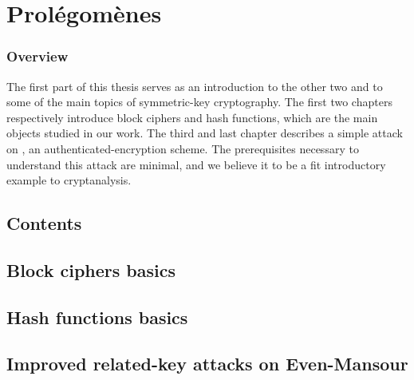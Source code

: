 \part[Prolégomènes]
	{Prolégomènes}
\label{part:prolego}

\section*{Overview}

The first part of this thesis serves as an introduction to the other two and to some of the
main topics of symmetric-key cryptography. The first two chapters respectively introduce block ciphers
and hash functions, which are the main objects studied in our work. The third and last chapter
describes a simple attack on \proestotr, an authenticated-encryption scheme. The prerequisites necessary
to understand this attack are minimal, and we believe it to be a fit introductory example to cryptanalysis.  



\cleardoublepage
\chapter*{Contents}
\parttoc


\chapter[Introduction aux chiffres par bloc]{Block ciphers basics}
\label{cha:block_intro}



\chapter[Introduction aux fonctions de hachage]{Hash functions basics}
\label{chap:hashfun}


\chapter[Attaques en clefs liées améliorées sur les schémas Even-Mansour]{Improved related-key attacks on Even-Mansour}
\label{cha:emrka}


